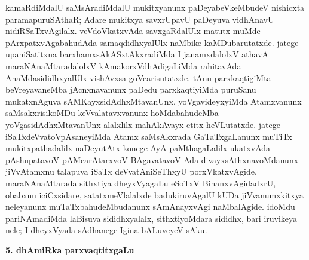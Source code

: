 kamaRdiMdalU saMsAradiMdalU mukitxyanunx paDeyabeVkeMbudeV nishicxta paramapuruSAthaR; Adare mukitxya savxrUpavU paDeyuva vidhAnavU nidiRSaTxvAgilalx. veVdoVkatxvAda savxgaRdalUlx matutx muMde pArxpatxvAgabahudAda samaqdidhxyalUlx naMbike kaMDubarutatxde. jatege upaniSatitxna barxhamxsAkASxtAkxradiMda I janamxdalolxV athavA maraNAnaMtaradalolxV kAmakorxVdhAdigaLiMda rahitavAda AnaMdasididhxyalUlx vishAvxsa goVcarisutatxde. tAnu parxkaqtigiMta beVreyavaneMba jAcnxnavanunx paDedu parxkaqtiyiMda puruSanu mukatxnAguva sAMKayxsidAdhxMtavanUnx, yoVgavideyxyiMda Atamxvanunx saMsakxrisikoMDu keVvalatavxvanunx hoMdabahudeMba yoVgasidAdhxMtavanUnx alalxlilx mahAkAvayx etitx heVLutatxde. jatege iSaTxdeVvatoVpAsaneyiMda Atamx saMsAkxrada GaTaTxgaLanunx muTiTx mukitxpathadalilx naDeyutAtx konege AyA paMthagaLalilx ukatxvAda pAshupatavoV pAMcarAtarxvoV BAgavatavoV Ada divayxsAthxnavoMdanunx jiVvAtamxnu talapuva iSaTx deVvatAniSeThxyU porxVkatxvAgide. maraNAnaMtarada sithxtiya dheyxVyagaLu eSoTxV BinanxvAgidadxrU, obabxnu iciCxsidare, satatxmeVlalalxde badukiruvAgalU kUDa jiVvanumxkitxya neleyanunx muTaTxbahudeMbudanunx sAmAnayxvAgi naMbalAgide. idoMdu pariNAmadiMda laBisuva sididhxyalalx, sithxtiyoMdara sididhx, bari iruvikeya nele; I dheyxVyada sAdhanege Igina bALuveyeV sAku.

\bigskip
\begin{center}
{\Large\bf 5. dhAmiRka parxvaqtitxgaLu}
\end{center}

